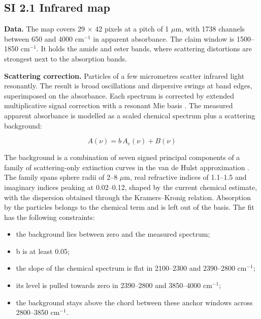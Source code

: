 \documentclass{iopjournal}
\providecommand{\tightlist}{\setlength{\itemsep}{0pt}\setlength{\parskip}{0pt}}
\begin{document}
\hypertarget{si-2.1-infrared-map}{%
\subsection*{SI 2.1 Infrared map}\label{si-2.1-infrared-map}}

\textbf{Data.} The map covers 29 \ensuremath{\times} 42 pixels at a pitch of 1 \ensuremath{\mu}m, with 1738 channels between 650 and 4000 cm\ensuremath{^{-1}} in apparent absorbance. The claim window is 1500--1850 cm\ensuremath{^{-1}}. It holds the amide and ester bands, where scattering distortions are strongest next to the absorption bands.

\textbf{Scattering correction.} Particles of a few micrometres scatter infrared light resonantly. The result is broad oscillations and dispersive swings at band edges, superimposed on the absorbance. Each spectrum is corrected by extended multiplicative signal correction with a resonant Mie basis \cite{MartensStark1991,Kohler2005,Bassan2010,Solheim2019}. The measured apparent absorbance is modelled as a scaled chemical spectrum plus a scattering background:

\[ A(\nu) = b\,A_{\mathrm{c}}(\nu) + B(\nu) \]

The background is a combination of seven signed principal components of a family of scattering-only extinction curves in the van de Hulst approximation \cite{vandeHulst1957}. The family spans sphere radii of 2--8 \ensuremath{\mu}m, real refractive indices of 1.1--1.5 and imaginary indices peaking at 0.02--0.12, shaped by the current chemical estimate, with the dispersion obtained through the Kramers--Kronig relation. Absorption by the particles belongs to the chemical term and is left out of the basis. The fit has the following constraints:

\begin{itemize}
\tightlist
\item
  the background lies between zero and the measured spectrum;
\item
  b is at least 0.05;
\item
  the slope of the chemical spectrum is flat in 2100--2300 and 2390--2800 cm\ensuremath{^{-1}};
\item
  its level is pulled towards zero in 2390--2800 and 3850--4000 cm\ensuremath{^{-1}};
\item
  the background stays above the chord between these anchor windows across 2800--3850 cm\ensuremath{^{-1}}.
\end{itemize}
\end{document}
